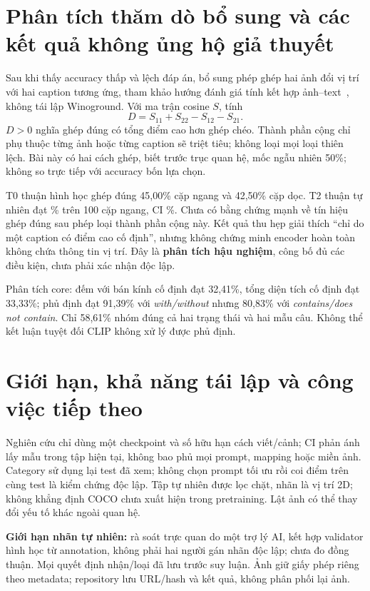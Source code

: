 \documentclass[11pt,a4paper]{article}
\begin{document}
\section{Phân tích thăm dò bổ sung và các kết quả không ủng hộ giả thuyết}
Sau khi thấy accuracy thấp và lệch đáp án, bổ sung phép ghép hai ảnh đổi vị trí với hai caption tương ứng, tham khảo hướng đánh giá tính kết hợp ảnh--text~\cite{winoground}, không tái lập Winoground. Với ma trận cosine $S$, tính
\[
 D=S_{11}+S_{22}-S_{12}-S_{21}.
\]
$D>0$ nghĩa ghép đúng có tổng điểm cao hơn ghép chéo. Thành phần cộng chỉ phụ thuộc từng ảnh hoặc từng caption sẽ triệt tiêu; không loại mọi loại thiên lệch. Bài này có hai cách ghép, biết trước trục quan hệ, mốc ngẫu nhiên 50\%; không so trực tiếp với accuracy bốn lựa chọn.

T0 thuận hình học ghép đúng 45,00\% cặp ngang và 42,50\% cặp dọc. T2 thuận tự nhiên đạt \NaturalPairAssignment\% trên 100 cặp ngang, CI \NaturalPairCI\%. Chưa có bằng chứng mạnh về tín hiệu ghép đúng sau phép loại thành phần cộng này. Kết quả thu hẹp giải thích ``chỉ do một caption có điểm cao cố định'', nhưng không chứng minh encoder hoàn toàn không chứa thông tin vị trí. Đây là \textbf{phân tích hậu nghiệm}, công bố đủ các điều kiện, chưa phải xác nhận độc lập.

Phân tích core: đếm với bán kính cố định đạt 32,41\%, tổng diện tích cố định đạt 33,33\%; phủ định đạt 91,39\% với \emph{with/without} nhưng 80,83\% với \emph{contains/does not contain}. Chỉ 58,61\% nhóm đúng cả hai trạng thái và hai mẫu câu. Không thể kết luận tuyệt đối CLIP không xử lý được phủ định.

\section{Giới hạn, khả năng tái lập và công việc tiếp theo}
Nghiên cứu chỉ dùng một checkpoint và số hữu hạn cách viết/cảnh; CI phản ánh lấy mẫu trong tập hiện tại, không bao phủ mọi prompt, mapping hoặc miền ảnh. Category sử dụng lại test đã xem; không chọn prompt tối ưu rồi coi điểm trên cùng test là kiểm chứng độc lập. Tập tự nhiên được lọc chặt, nhãn là vị trí 2D; không khẳng định COCO chưa xuất hiện trong pretraining. Lật ảnh có thể thay đổi yếu tố khác ngoài quan hệ.

\textbf{Giới hạn nhãn tự nhiên:} rà soát trực quan do một trợ lý AI, kết hợp validator hình học từ annotation, không phải hai người gán nhãn độc lập; chưa đo đồng thuận. Mọi quyết định nhận/loại đã lưu trước suy luận. Ảnh giữ giấy phép riêng theo metadata; repository lưu URL/hash và kết quả, không phân phối lại ảnh.
\end{document}
